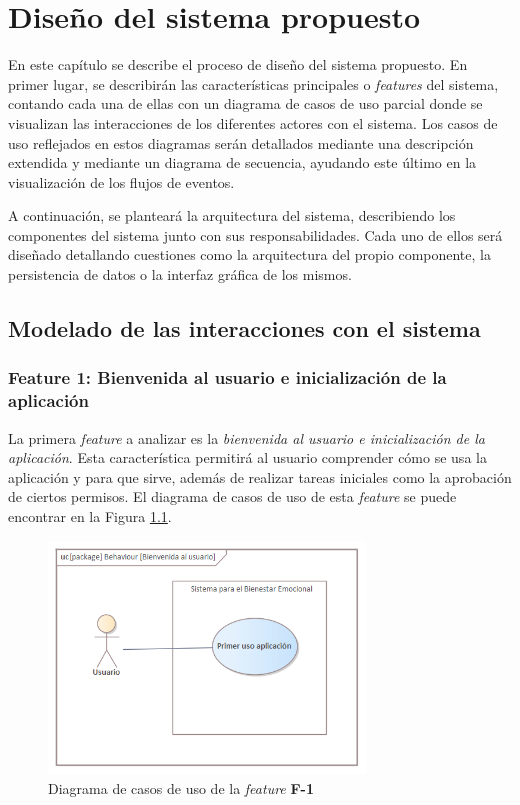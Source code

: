 \chapter{Diseño del sistema propuesto}
\label{chapter:disenio}


En este capítulo se describe el proceso de diseño del sistema propuesto. En primer lugar, se describirán las características principales o \textit{features} del sistema, contando cada una de ellas con un diagrama de casos de uso parcial donde se visualizan las interacciones de los diferentes actores con el sistema. Los casos de uso reflejados en estos diagramas serán detallados mediante una descripción extendida y mediante un diagrama de secuencia, ayudando este último en la visualización de los flujos de eventos.

A continuación, se planteará la arquitectura del sistema, describiendo los componentes del sistema junto con sus responsabilidades. Cada uno de ellos será diseñado detallando cuestiones como la arquitectura del propio componente, la persistencia de datos o la interfaz gráfica de los mismos.

    \section{Modelado de las interacciones con el sistema}

        \subsection*{Feature 1: Bienvenida al usuario e inicialización de la aplicación}

            La primera \textit{feature} a analizar es la \textit{bienvenida al usuario e inicialización de la aplicación}. Esta característica permitirá al usuario comprender cómo se usa la aplicación y para que sirve, además de realizar tareas iniciales como la aprobación de ciertos permisos. El diagrama de casos de uso de esta \textit{feature} se puede encontrar en la Figura \ref{figure:diagrama_casos_uso:f1}.

            \begin{figure}[h]
                \centering
                \includegraphics[width=0.75\textwidth]{figures/diseno/casos_uso/Bienvenida al usuario.png}
                \caption{Diagrama de casos de uso de la \textit{feature} \textbf{F-1}}
                \label{figure:diagrama_casos_uso:f1}
            \end{figure}

